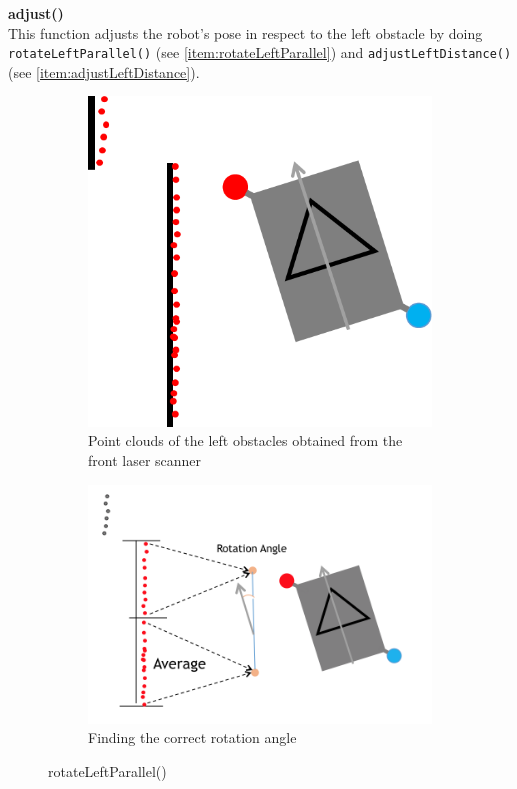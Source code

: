 \begin{description}
\item \textbf{adjust()} \hfill \\
This function adjusts the robot's pose in respect to the left obstacle by doing \\ \texttt{rotateLeftParallel()} (see \ref{item:rotateLeftParallel}) and  \texttt{adjustLeftDistance()} (see \ref{item:adjustLeftDistance}).
\begin{figure}[ht]
\centering
\begin{subfigure}{.5\textwidth}
	\centering
	\includegraphics[scale=0.65]{graphics/rotate_left_parallel01.png}
	\caption{Point clouds of the left obstacles obtained from the front laser scanner}
	\label{rotate_left_parallel01}
\end{subfigure}%
\begin{subfigure}{.5\textwidth}
	\centering
	\includegraphics[scale=0.55]{graphics/rotate_left_parallel02.png}
	\caption{Finding the correct rotation angle}
	\label{rotate_left_parallel02}
\end{subfigure}
\caption{rotateLeftParallel()}
\label{fig:side_by_side}
\end{figure}


\end{description}
